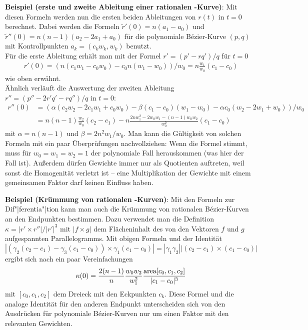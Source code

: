 \textbf{Beispiel (erste und zweite Ableitung einer rationalen -Kurve)}:
Mit diesen Formeln werden nun die ersten beiden Ableitungen von $r(t)$ in $t = 0$ berechnet.
Dabei werden die Formeln $\widetilde{r}'(0) = n(a_1 - a_0)$ und
$\widetilde{r}''(0) = n(n - 1)(a_2 - 2a_1 + a_0)$ für die polynomiale Bézier-Kurve $(p, q)$
mit Kontrollpunkten $a_k = (c_k w_k, w_k)$ benutzt.\\
Für die erste Ableitung erhält man mit der Formel $r' = (p' - rq')/q$ für $t = 0$
\begin{align*}
    r'(0) = (n(c_1 w_1 - c_0 w_0) - c_0 n (w_1 - w_0)) / w_0
    = n \frac{w_1}{w_0} (c_1 - c_0)
\end{align*}
wie oben erwähnt.\\
Ähnlich verläuft die Auswertung der zweiten Ableitung
$r'' = (p'' - 2r'q' - rq'')/q$ in $t = 0$:
\begin{align*}
    r''(0) &= (\alpha (c_2 w_2 - 2 c_1 w_1 + c_0 w_0) - \beta (c_1 - c_0) (w_1 - w_0) -
    \alpha c_0 (w_2 - 2 w_1 + w_0)) / w_0\\
    &= n (n - 1) \frac{w_2}{w_0} (c_2 - c_1) - n \frac{2nw_1^2 - 2w_0w_1 - (n - 1)w_0w_2}{w_0^2}
    (c_1 - c_0)
\end{align*}
mit $\alpha = n (n - 1)$ und $\beta = 2n^2 w_1/w_0$.
Man kann die Gültigkeit von solchen Formeln mit ein paar Überprüfungen nachvollziehen:
Wenn die Formel stimmt, muss für $w_0 = w_1 = w_2 = 1$ der polynomiale Fall herauskommen
(was hier der Fall ist).
Außerdem dürfen Gewichte immer nur als Quotienten auftreten, weil sonst die Homogenität verletzt
ist -- eine Multiplikation der Gewichte mit einem gemeinsamen Faktor darf keinen Einfluss haben.

\linie

\textbf{Beispiel (Krümmung von rationalen -Kurven)}:
Mit den Formeln zur Dif"|ferentia"|tion kann man auch die Krümmung von rationalen Bézier-Kurven
an den Endpunkten bestimmen.
Dazu verwendet man die Definition $\kappa = |r' \times r''|/|r'|^3$ mit
$|f \times g|$ dem Flächeninhalt des von den Vektoren $f$ und $g$ aufgespannten Parallelogramms.
Mit obigen Formeln und der Identität
$|(\gamma_2 (c_2 - c_1) - \gamma_3 (c_1 - c_0)) \times \gamma_1 (c_1 - c_0)| =
|\gamma_1 \gamma_2| |(c_2 - c_1) \times (c_1 - c_0)|$ ergibt sich nach ein paar Vereinfachungen
\begin{align*}
    \kappa(0) = \frac{2(n - 1)}{n} \frac{w_0 w_2}{w_1^2} \frac{\mathrm{area}[c_0, c_1, c_2]}{|c_1 - c_0|^3}
\end{align*}
mit $[c_0, c_1, c_2]$ dem Dreieck mit den Eckpunkten $c_k$.
Diese Formel und die analoge Identität für den anderen Endpunkt unterscheiden sich von den
Ausdrücken für polynomiale Bézier-Kurven nur um einen Faktor mit den relevanten Gewichten.

